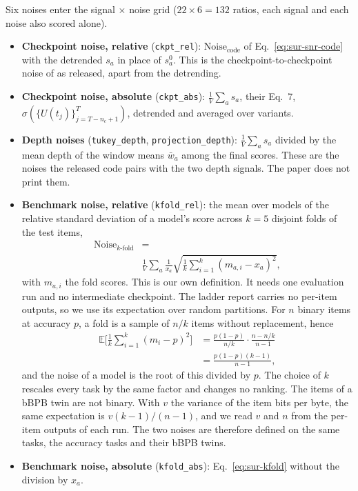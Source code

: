 Six noises enter the signal $\times$ noise grid ($22 \times 6 = 132$ ratios, each signal and each noise also scored alone).

\begin{itemize}[itemsep=1pt,topsep=2pt]
\item \textbf{Checkpoint noise, relative} (\texttt{ckpt\_rel}): $\text{Noise}_{\text{code}}$ of Eq.~\ref{eq:sur-snr-code} with the detrended $s_a$ in place of $s^{0}_a$. This is the checkpoint-to-checkpoint noise of \citet{heineman_signal_2025} as released, apart from the detrending.
\item \textbf{Checkpoint noise, absolute} (\texttt{ckpt\_abs}): $\frac{1}{V}\sum_a s_a$, their Eq.~7, $\sigma(\{U(t_j)\}_{j=T-n_c+1}^{T})$, detrended and averaged over variants.
\item \textbf{Depth noises} (\texttt{tukey\_depth}, \texttt{projection\_depth}): $\frac{1}{V}\sum_a s_a$ divided by the mean depth of the window means $\bar{w}_a$ among the final scores. These are the noises the released code pairs with the two depth signals. The paper does not print them.
\item \textbf{Benchmark noise, relative} (\texttt{kfold\_rel}): the mean over models of the relative standard deviation of a model's score across $k = 5$ disjoint folds of the test items,
\begin{equation}
\begin{aligned}
\text{Noise}_{k\text{-fold}} &= {} \\
&\frac{1}{V}\sum_a \frac{1}{x_a}\sqrt{\frac{1}{k}\sum_{i=1}^{k}(m_{a,i} - x_a)^2},
\end{aligned}
\label{eq:sur-kfold}
\end{equation}
with $m_{a,i}$ the fold scores. This is our own definition. It needs one evaluation run and no intermediate checkpoint.
The ladder report carries no per-item outputs, so we use its expectation over random partitions. For $n$ binary items at accuracy $p$, a fold is a sample of $n/k$ items without replacement, hence
\begin{equation}
\begin{aligned}
\mathbb{E}\Big[\frac{1}{k}\sum_{i=1}^{k}(m_i - p)^2\Big] &= \frac{p(1-p)}{n/k}\cdot\frac{n - n/k}{n - 1} \\
&= \frac{p(1-p)(k-1)}{n-1},
\end{aligned}
\label{eq:sur-kfold-closed}
\end{equation}
and the noise of a model is the root of this divided by $p$. The choice of $k$ rescales every task by the same factor and changes no ranking.
The items of a bBPB twin are not binary. With $v$ the variance of the item bits per byte, the same expectation is $v(k-1)/(n-1)$, and we read $v$ and $n$ from the per-item outputs of each run. The two noises are therefore defined on the same tasks, the accuracy tasks and their bBPB twins.
\item \textbf{Benchmark noise, absolute} (\texttt{kfold\_abs}): Eq.~\ref{eq:sur-kfold} without the division by $x_a$.
\end{itemize}

